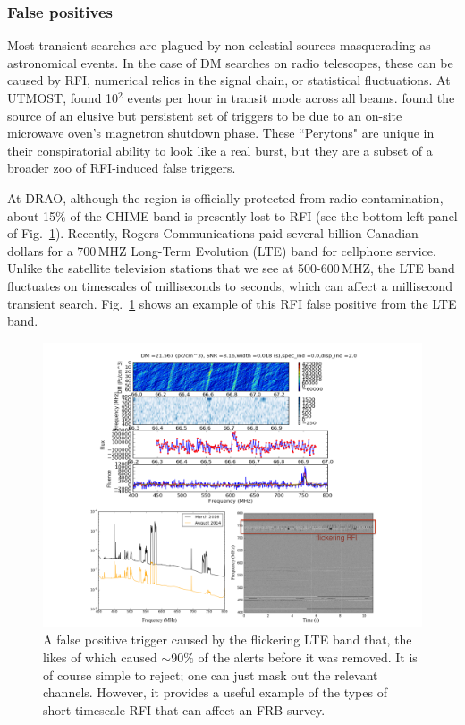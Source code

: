 \subsubsection{False positives}

Most transient searches are plagued by non-celestial sources masquerading 
as astronomical events. 
In the case of DM searches on 
radio telescopes, these can be caused by RFI, numerical relics 
in the signal chain, or statistical fluctuations. 
At UTMOST, \citet{2016MNRAS.458..718C} found 
10$^2$ events per hour in transit mode across all beams. \citet{2015MNRAS.451.3933P}
found the source of an elusive but persistent set of triggers 
to be due to an on-site microwave oven's magnetron shutdown phase. These 
``Perytons" are unique in their conspiratorial ability to 
look like a real burst, but they are a subset of a broader zoo 
of RFI-induced false triggers. 

At DRAO, although the region is officially 
protected from radio contamination, about 15$\%$ of the CHIME
band is presently lost to RFI (see the bottom left 
panel of Fig.~\ref{fig-lte_trigger}). Recently, Rogers Communications 
paid several billion Canadian dollars for a 700\,MHZ 
Long-Term Evolution (LTE) band for cellphone service.
Unlike the satellite television stations that we see at 500-600\,MHZ, 
the LTE band fluctuates on timescales of milliseconds to seconds, 
which can affect a millisecond transient search. 
Fig.~\ref{fig-lte_trigger} shows an example of this RFI false 
positive from the LTE band. 


\begin{figure}[!h]
\begin{center}
\includegraphics[trim={0in 0in 0in 0in}, scale=0.5]
{./figures/beamforming/lte_trigger.png}
\vspace{0.0cm}
\caption[abc]{A false positive trigger caused by the flickering 
     LTE band that, the likes of which 
     caused $\sim$90$\%$ of the alerts before it was removed.
     It is of course simple to reject; one can just mask 
     out the relevant channels.
     However, it provides a useful example of the types of 
     short-timescale RFI that can affect an FRB survey.}
\label{fig-lte_trigger}
\end{center}
\end{figure}


